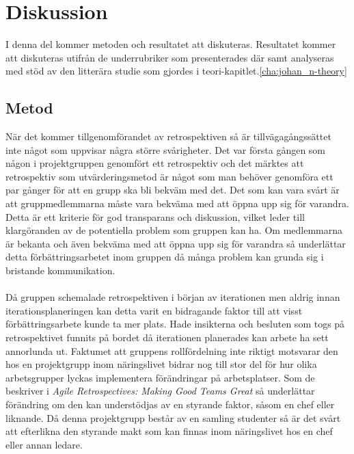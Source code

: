 \section{Diskussion}
\label{cha:johan_n-discussion}
I denna del kommer metoden och resultatet att diskuteras. Resultatet kommer att diskuteras utifrån de underrubriker som presenterades där samt analyseras med stöd av den litterära studie som gjordes i teori-kapitlet.\ref{cha:johan_n-theory}


\subsection{Metod}
\label{sec:johan_n-discussion-method}
När det kommer tillgenomförandet av retrospektiven så är tillvägagångssättet inte något som uppvisar några större svårigheter. Det var första gången som någon i projektgruppen genomfört ett retrospektiv och det märktes att retrospektiv som utvärderingsmetod är något som man behöver genomföra ett par gånger för att en grupp ska bli bekväm med det. Det som kan vara svårt är att gruppmedlemmarna måste vara bekväma med att öppna upp sig för varandra. Detta är ett kriterie för god transparans och diskussion, vilket leder till klargöranden av de potentiella problem som gruppen kan ha. Om medlemmarna är bekanta och även bekväma med att öppna upp sig för varandra så underlättar detta förbättringsarbetet inom gruppen då många problem kan grunda sig i bristande kommunikation. \\ \\
Då gruppen schemalade retrospektiven i början av iterationen men aldrig innan iterationsplaneringen kan detta varit en bidragande faktor till att visst förbättringsarbete kunde ta mer plats. Hade insikterna och besluten som togs på retrospektivet funnits på bordet då iterationen planerades kan arbete ha sett annorlunda ut.
Faktumet att gruppens rollfördelning inte riktigt motsvarar den hos en projektgrupp inom näringslivet bidrar nog till stor del för hur olika arbetsgrupper lyckas implementera förändringar på arbetsplatser. Som de beskriver i \textit{Agile Retrospectives: Making Good Teams Great} så underlättar förändring om den kan understödjas av en styrande faktor, såsom en chef eller liknande.\cite{agile_retrospectives} Då denna projektgrupp består av en samling studenter så är det svårt att efterlikna den styrande makt som kan finnas inom näringslivet hos en chef eller annan ledare. 

